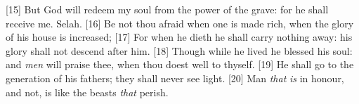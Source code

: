 [15] \textcolor[cmyk]{0.99998,1,0,0}{But God will redeem my soul from the power of the grave: for he shall receive me. Selah.}
[16] \textcolor[cmyk]{0.99998,1,0,0}{Be not thou afraid when one is made rich, when the glory of his house is increased;}
[17] \textcolor[cmyk]{0.99998,1,0,0}{For when he dieth he shall carry nothing away: his glory shall not descend after him.}
[18] \textcolor[cmyk]{0.99998,1,0,0}{Though while he lived he blessed his soul: and \emph{men} will praise thee, when thou doest well to thyself.}
[19] \textcolor[cmyk]{0.99998,1,0,0}{He shall go to the generation of his fathers; they shall never see light.}
[20] \textcolor[cmyk]{0.99998,1,0,0}{Man \emph{that} \emph{is} in honour, and  not, is like the beasts \emph{that} perish.}